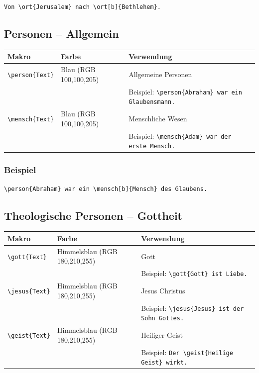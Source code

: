 \documentclass[12pt,a4paper]{scrartcl}
\begin{document}
\begin{lstlisting}
Von \ort{Jerusalem} nach \ort[b]{Bethlehem}.
\end{lstlisting}

\subsection{Personen -- Allgemein}

\begin{longtable}{llp{8cm}}
\toprule
\textbf{Makro} & \textbf{Farbe} & \textbf{Verwendung} \\
\midrule
\endhead
%
\lstinline|\person{Text}| & Blau (RGB 100,100,205) & Allgemeine Personen \\
& & Beispiel: \lstinline|\person{Abraham} war ein Glaubensmann.| \\[0.5em]
%
\lstinline|\mensch{Text}| & Blau (RGB 100,100,205) & Menschliche Wesen \\
& & Beispiel: \lstinline|\mensch{Adam} war der erste Mensch.| \\
\bottomrule
\end{longtable}

\subsubsection{Beispiel}

\begin{lstlisting}
\person{Abraham} war ein \mensch[b]{Mensch} des Glaubens.
\end{lstlisting}

\subsection{Theologische Personen -- Gottheit}

\begin{longtable}{llp{8cm}}
\toprule
\textbf{Makro} & \textbf{Farbe} & \textbf{Verwendung} \\
\midrule
\endhead
%
\lstinline|\gott{Text}| & Himmelsblau (RGB 180,210,255) & Gott \\
& & Beispiel: \lstinline|\gott{Gott} ist Liebe.| \\[0.5em]
%
\lstinline|\jesus{Text}| & Himmelsblau (RGB 180,210,255) & Jesus Christus \\
& & Beispiel: \lstinline|\jesus{Jesus} ist der Sohn Gottes.| \\[0.5em]
%
\lstinline|\geist{Text}| & Himmelsblau (RGB 180,210,255) & Heiliger Geist \\
& & Beispiel: \lstinline|Der \geist{Heilige Geist} wirkt.| \\
\bottomrule
\end{longtable}
\end{document}
